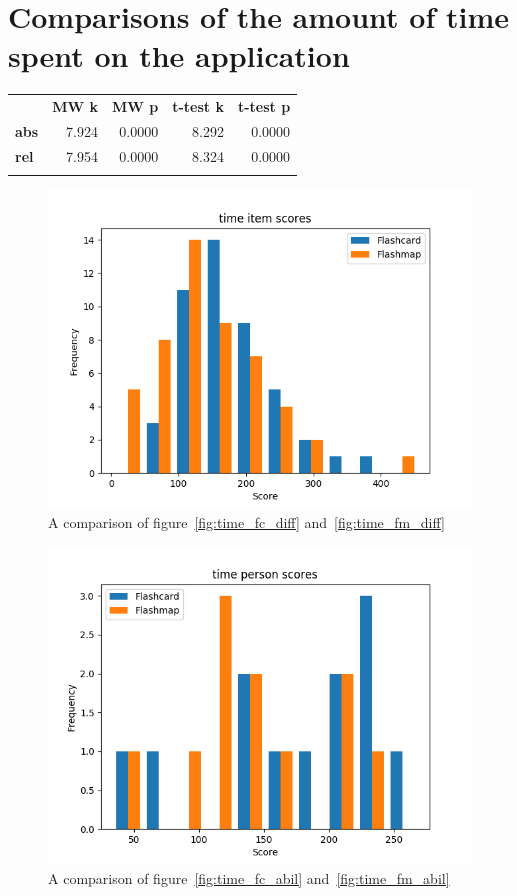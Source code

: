 \FloatBarrier
\section{Comparisons of the amount of time spent on the application}

\begin{longtable}[c]{@{}lrrrr@{}}
\toprule\addlinespace
& \textbf{MW k} & \textbf{MW p} &
\textbf{t-test k} & \textbf{t-test p}
\\\addlinespace
\midrule
\textbf{abs} & 7.924 & 0.0000 & 8.292 & 0.0000
\\\addlinespace
\textbf{rel} & 7.954 & 0.0000 & 8.324 & 0.0000
\\\addlinespace
\bottomrule
    \label{tab:time_comp}
\end{longtable}

\begin{figure}
    \centering
    \includegraphics[width=.7\textwidth]{img/time_diff.png}
    \caption{A comparison of figure~\protect\ref{fig:time_fc_diff} and~\protect\ref{fig:time_fm_diff}}
    \label{fig:time_diff}
\end{figure}
\begin{figure}
    \centering
    \includegraphics[width=.7\textwidth]{img/time_abil.png}
    \caption{A comparison of figure~\protect\ref{fig:time_fc_abil} and~\protect\ref{fig:time_fm_abil}}
    \label{fig:time_abil}
\end{figure}
